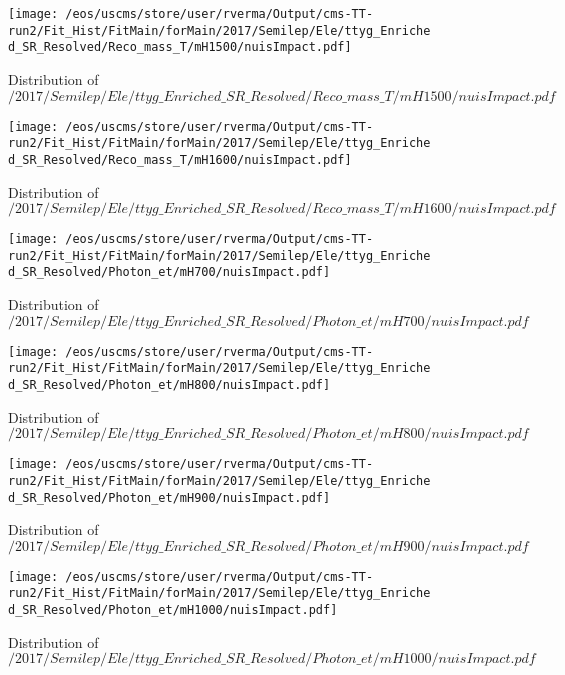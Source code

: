 \begin{figure}
\centering
\texttt{[image: /eos/uscms/store/user/rverma/Output/cms-TT-run2/Fit\_Hist/FitMain/forMain/2017/Semilep/Ele/ttyg\_Enriched\_SR\_Resolved/Reco\_mass\_T/mH1500/nuisImpact.pdf]}
\caption{Distribution of $/2017/Semilep/Ele/ttyg\_Enriched\_SR\_Resolved/Reco\_mass\_T/mH1500/nuisImpact.pdf$}
\end{figure}

\begin{figure}
\centering
\texttt{[image: /eos/uscms/store/user/rverma/Output/cms-TT-run2/Fit\_Hist/FitMain/forMain/2017/Semilep/Ele/ttyg\_Enriched\_SR\_Resolved/Reco\_mass\_T/mH1600/nuisImpact.pdf]}
\caption{Distribution of $/2017/Semilep/Ele/ttyg\_Enriched\_SR\_Resolved/Reco\_mass\_T/mH1600/nuisImpact.pdf$}
\end{figure}

\begin{figure}
\centering
\texttt{[image: /eos/uscms/store/user/rverma/Output/cms-TT-run2/Fit\_Hist/FitMain/forMain/2017/Semilep/Ele/ttyg\_Enriched\_SR\_Resolved/Photon\_et/mH700/nuisImpact.pdf]}
\caption{Distribution of $/2017/Semilep/Ele/ttyg\_Enriched\_SR\_Resolved/Photon\_et/mH700/nuisImpact.pdf$}
\end{figure}

\begin{figure}
\centering
\texttt{[image: /eos/uscms/store/user/rverma/Output/cms-TT-run2/Fit\_Hist/FitMain/forMain/2017/Semilep/Ele/ttyg\_Enriched\_SR\_Resolved/Photon\_et/mH800/nuisImpact.pdf]}
\caption{Distribution of $/2017/Semilep/Ele/ttyg\_Enriched\_SR\_Resolved/Photon\_et/mH800/nuisImpact.pdf$}
\end{figure}

\begin{figure}
\centering
\texttt{[image: /eos/uscms/store/user/rverma/Output/cms-TT-run2/Fit\_Hist/FitMain/forMain/2017/Semilep/Ele/ttyg\_Enriched\_SR\_Resolved/Photon\_et/mH900/nuisImpact.pdf]}
\caption{Distribution of $/2017/Semilep/Ele/ttyg\_Enriched\_SR\_Resolved/Photon\_et/mH900/nuisImpact.pdf$}
\end{figure}

\begin{figure}
\centering
\texttt{[image: /eos/uscms/store/user/rverma/Output/cms-TT-run2/Fit\_Hist/FitMain/forMain/2017/Semilep/Ele/ttyg\_Enriched\_SR\_Resolved/Photon\_et/mH1000/nuisImpact.pdf]}
\caption{Distribution of $/2017/Semilep/Ele/ttyg\_Enriched\_SR\_Resolved/Photon\_et/mH1000/nuisImpact.pdf$}
\end{figure}


